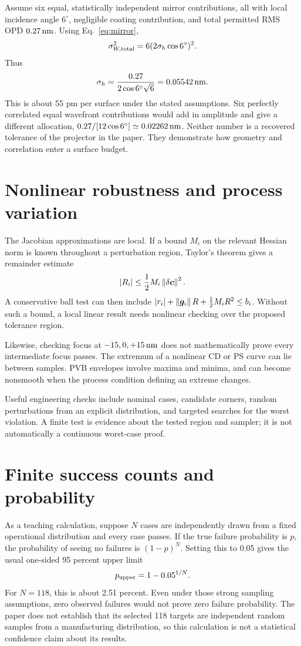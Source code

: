 Assume six equal, statistically independent mirror contributions, all
with local incidence angle $6^\circ$, negligible coating contribution,
and total permitted RMS OPD $0.27\,\mathrm{nm}$.
Using Eq.~\eqref{eq:mirror},
\[
\sigma_{W,\rm total}^2
=6(2\sigma_h\cos6^\circ)^2.
\]
Thus
\[
\sigma_h=\frac{0.27}{2\cos6^\circ\sqrt6}
=0.05542\,\mathrm{nm}.
\]
This is about 55 pm per surface under the stated assumptions.
Six perfectly correlated equal wavefront contributions would add in
amplitude and give a different allocation,
$0.27/[12\cos6^\circ]\simeq0.02262\,\mathrm{nm}$.
Neither number is a recovered tolerance of the projector in the paper.
They demonstrate how geometry and correlation enter a surface budget.

\section{Nonlinear robustness and process variation}
The Jacobian approximations are local. If a bound $M_i$ on the
relevant Hessian norm is known throughout a perturbation region, Taylor's
theorem gives a remainder estimate
\[
|R_i|\leq\frac12M_i\left\lVert\delta\bm{c}\right\rVert^2.
\]
A conservative ball test can then include
$|r_i|+\left\lVert\bm{g}_i\right\rVert R+\tfrac12M_iR^2\leq b_i$.
Without such a bound, a local linear result needs nonlinear checking
over the proposed tolerance region.

Likewise, checking focus at $-15,0,+15\,\mathrm{nm}$ does not mathematically
prove every intermediate focus passes. The extremum of a nonlinear
CD or PS curve can lie between samples.
PVB envelopes involve maxima and minima, and can become nonsmooth
when the process condition defining an extreme changes.

Useful engineering checks include nominal cases, candidate corners,
random perturbations from an explicit distribution, and targeted searches
for the worst violation. A finite test is evidence about the tested
region and sampler; it is not automatically a continuous worst-case proof.

\section{Finite success counts and probability}
As a teaching calculation, suppose $N$ cases are independently drawn
from a fixed operational distribution and every case passes.
If the true failure probability is $p$, the probability of seeing no
failures is $(1-p)^N$.
Setting this to 0.05 gives the usual one-sided 95 percent upper limit
\[
p_{\rm upper}=1-0.05^{1/N}.
\]
For $N=118$, this is about 2.51 percent.
Even under those strong sampling assumptions, zero observed failures
would not prove zero failure probability.
The paper does not establish that its selected 118 targets are
independent random samples from a manufacturing distribution, so this
calculation is not a statistical confidence claim about its results.

